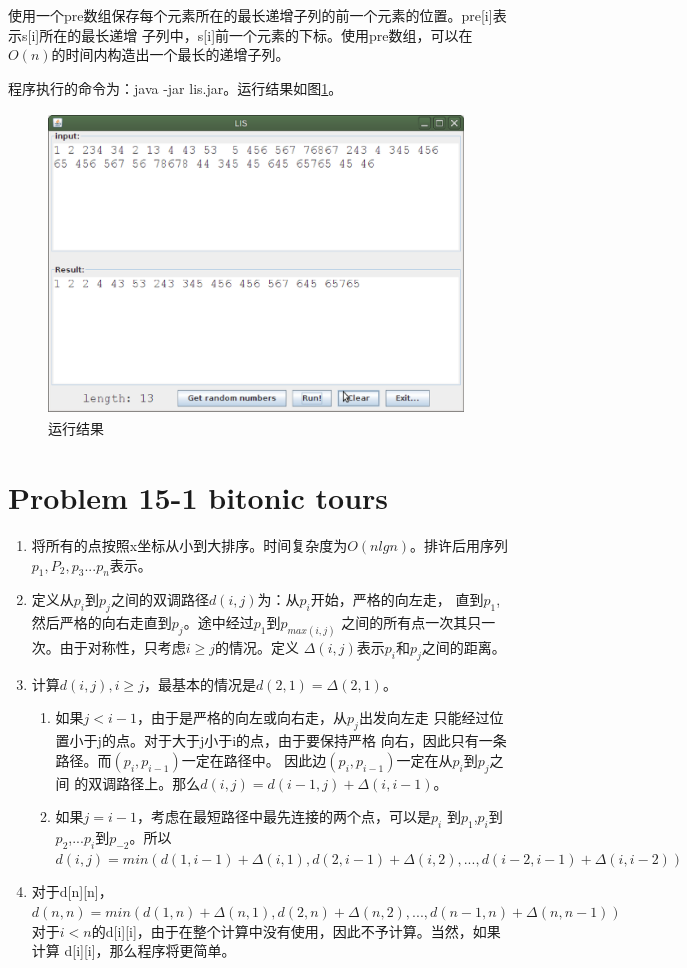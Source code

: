 \documentclass[a4paper, 11pt]{article}
\begin{document}
使用一个pre数组保存每个元素所在的最长递增子列的前一个元素的位置。pre[i]表示s[i]所在的最长递增
子列中，s[i]前一个元素的下标。使用pre数组，可以在$O(n)$的时间内构造出一个最长的递增子列。

程序执行的命令为：java -jar lis.jar。运行结果如图\ref{result}。

\begin{figure}[htbp]
\centering
\caption{运行结果}
\label{result}
\includegraphics[height=8cm, width=11cm]{LIS.eps}
\end{figure}

\section{Problem 15-1 bitonic tours}

\begin{enumerate}
	\item 将所有的点按照x坐标从小到大排序。时间复杂度为$O(nlgn)$。排许后用序列
		$p_1, P_2, p_3 ... p_n$表示。
	\item 定义从$p_i$到$p_j$之间的双调路径$d(i,j)$为：从$p_i$开始，严格的向左走，
		直到$p_1$,然后严格的向右走直到$p_j$。途中经过$p_1$到$p_{max(i,j)}$
		之间的所有点一次其只一次。由于对称性，只考虑$i \ge j$的情况。定义
		$\Delta(i,j)$表示$p_i$和$p_j$之间的距离。
	\item 计算$d(i,j), i \ge j$，最基本的情况是$d(2,1)=\Delta(2,1)$。
		\begin{enumerate}
			\item 如果$j < i-1$，由于是严格的向左或向右走，从$p_j$出发向左走
				只能经过位置小于j的点。对于大于j小于i的点，由于要保持严格
				向右，因此只有一条路径。而$(p_i, p_{i-1})$一定在路径中。
				因此边$(p_i, p_{i-1})$一定在从$p_i$到$p_j$之间
				的双调路径上。那么$d(i,j)=d(i-1,j)+\Delta(i, i-1)$。
			\item 如果$j = i-1$，考虑在最短路径中最先连接的两个点，可以是$p_i$
				到$p_1$,$p_i$到$p_2$,...$p_i$到$p_{-2}$。所以
$d(i,j)=min(d(1,i-1)+\Delta(i,1),d(2,i-1)+\Delta(i,2),...,d(i-2,i-1)+\Delta(i,i-2))$
		\end{enumerate}
	\item 对于d[n][n]，
$d(n,n)=min(d(1,n)+\Delta(n,1),d(2,n)+\Delta(n,2),...,d(n-1,n)+\Delta(n,n-1))$
		对于$i < n$的d[i][i]，由于在整个计算中没有使用，因此不予计算。当然，如果计算
		d[i][i]，那么程序将更简单。
\end{enumerate}
	
\end{document}
